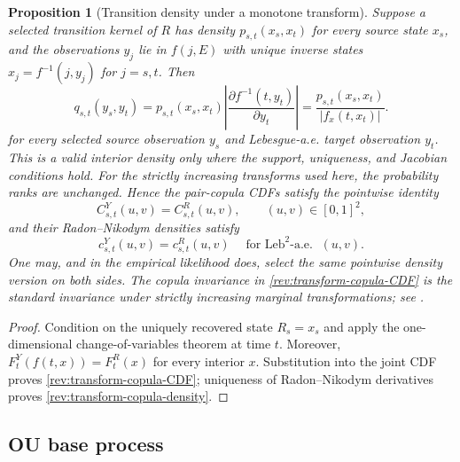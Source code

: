 \documentclass[11pt]{article}
\newtheorem{proposition}[definition]{Proposition}
\theoremstyle{remark}
\newcommand{\Leb}{\operatorname{Leb}}
\begin{document}
\begin{proposition}[Transition density under a monotone transform]
\label{rev:prop-transform-density}
Suppose a selected transition kernel of $R$ has density
$p_{s,t}(x_s,x_t)$ for every source state $x_s$, and the observations $y_j$
lie in $f(j,E)$ with unique inverse states
$x_j=f^{-1}(j,y_j)$ for $j=s,t$.  Then
\begin{equation}
q_{s,t}(y_s,y_t)=p_{s,t}(x_s,x_t)
\left|\frac{\partial f^{-1}(t,y_t)}{\partial y_t}\right|
=\frac{p_{s,t}(x_s,x_t)}{|f_x(t,x_t)|}.
\label{rev:transform-density}
\end{equation}
for every selected source observation $y_s$ and Lebesgue-a.e. target
observation $y_t$.  This is a valid interior density only where the support,
uniqueness, and Jacobian conditions hold.  For the strictly increasing
transforms used here, the probability ranks are unchanged.  Hence the
pair-copula CDFs satisfy the pointwise identity
\begin{equation}
C^Y_{s,t}(u,v)=C^R_{s,t}(u,v),
\qquad (u,v)\in[0,1]^2,
\label{rev:transform-copula-CDF}
\end{equation}
and their Radon--Nikodym densities satisfy
\begin{equation}
c^Y_{s,t}(u,v)=c^R_{s,t}(u,v)
\quad\text{for $\Leb^2$-a.e. }(u,v).
\label{rev:transform-copula-density}
\end{equation}
One may, and in the empirical likelihood does, select the same pointwise
density version on both sides.  The copula invariance in
\eqref{rev:transform-copula-CDF} is the standard invariance under strictly
increasing marginal transformations; see \citet[Chapter~2]{Nelsen2006}.
\end{proposition}

\begin{proof}
Condition on the uniquely recovered state $R_s=x_s$ and apply the
one-dimensional change-of-variables theorem at time $t$.  Moreover,
$F_t^Y(f(t,x))=F_t^R(x)$ for every interior $x$.  Substitution into the joint
CDF proves \eqref{rev:transform-copula-CDF}; uniqueness of
Radon--Nikodym derivatives proves \eqref{rev:transform-copula-density}.
\end{proof}

\subsection{OU base process}
\end{document}

